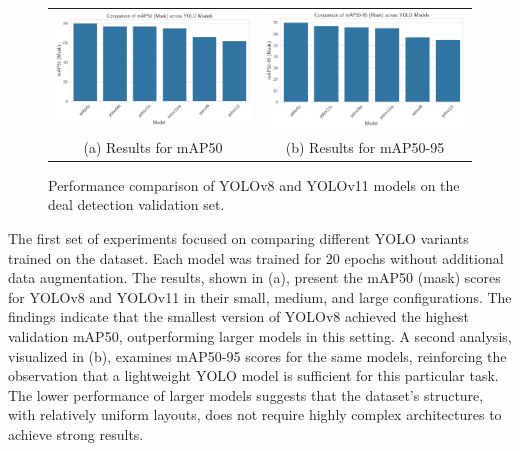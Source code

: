 \documentclass[11pt]{article}
\begin{document}
\begin{figure}[h!]
    \centering
    \begin{tabular}{cc}
    \includegraphics[width=0.5\linewidth]{figures/deal_detection/map50_all_yolo.png} &   \includegraphics[width=0.5\linewidth]{figures/deal_detection/map50_95_all_yolo.png} \\
    (a) Results for mAP50 & (b) Results for mAP50-95 \\[2pt]
    \end{tabular}
    \caption{Performance comparison of YOLOv8 and YOLOv11 models on the deal detection validation set.}
    \label{fig:all_yolo_results}
\end{figure}

The first set of experiments focused on comparing different YOLO variants trained on the dataset. Each model was trained for 20 epochs without additional data augmentation. The results, shown in  (a), present the mAP50 (mask) scores for YOLOv8 and YOLOv11 in their small, medium, and large configurations. The findings indicate that the smallest version of YOLOv8 achieved the highest validation mAP50, outperforming larger models in this setting. A second analysis, visualized in  (b), examines mAP50-95 scores for the same models, reinforcing the observation that a lightweight YOLO model is sufficient for this particular task. The lower performance of larger models suggests that the dataset’s structure, with relatively uniform layouts, does not require highly complex architectures to achieve strong results.
\end{document}
